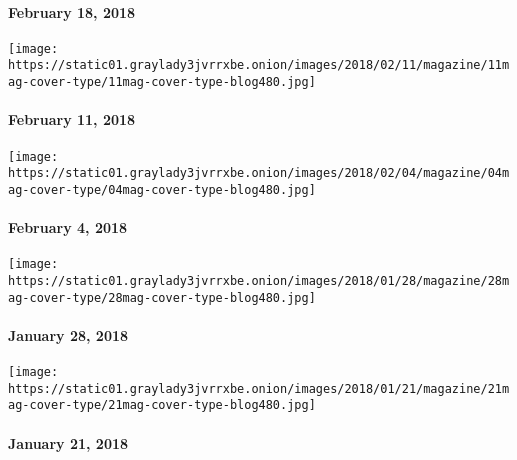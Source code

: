 \hypertarget{february-18-2018}{%
\paragraph{February 18, 2018}\label{february-18-2018}}

\href{https://www.nytimes3xbfgragh.onion/issue/magazine/2018/02/09/21118-issue}{}

\texttt{[image: https://static01.graylady3jvrrxbe.onion/images/2018/02/11/magazine/11mag-cover-type/11mag-cover-type-blog480.jpg]}

\hypertarget{february-11-2018}{%
\paragraph{February 11, 2018}\label{february-11-2018}}

\href{https://www.nytimes3xbfgragh.onion/interactive/2018/01/30/magazine/winter-olympics-alpine-skiing-lindsey-vonn-workout.html}{}

\texttt{[image: https://static01.graylady3jvrrxbe.onion/images/2018/02/04/magazine/04mag-cover-type/04mag-cover-type-blog480.jpg]}

\hypertarget{february-4-2018}{%
\paragraph{February 4, 2018}\label{february-4-2018}}

\href{https://www.nytimes3xbfgragh.onion/issue/magazine/2018/02/01/12818-issue}{}

\texttt{[image: https://static01.graylady3jvrrxbe.onion/images/2018/01/28/magazine/28mag-cover-type/28mag-cover-type-blog480.jpg]}

\hypertarget{january-28-2018}{%
\paragraph{January 28, 2018}\label{january-28-2018}}

\href{https://www.nytimes3xbfgragh.onion/issue/magazine/2018/01/12/12118-issue}{}

\texttt{[image: https://static01.graylady3jvrrxbe.onion/images/2018/01/21/magazine/21mag-cover-type/21mag-cover-type-blog480.jpg]}

\hypertarget{january-21-2018}{%
\paragraph{January 21, 2018}\label{january-21-2018}}

